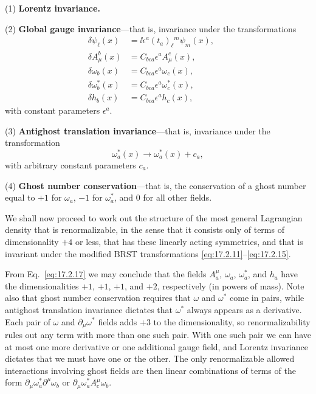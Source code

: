 \noindent(1) \textbf{Lorentz invariance.}

\noindent(2) \textbf{Global gauge invariance}---that is, invariance under the transformations
\begin{align}
\delta\psi_\ell(x)&=\ii\epsilon^a(t_a)_\ell{}^m\psi_m(x),
&&\tag{17.2.18}\label{eq:17.2.18}\\
\delta A^b_\mu(x)&=C_{bca}\epsilon^a A^c_\mu(x),
&&\tag{17.2.19}\label{eq:17.2.19}\\
\delta\omega_b(x)&=C_{bca}\epsilon^a\omega_c(x),
&&\tag{17.2.20}\label{eq:17.2.20}\\
\delta\omega_b^*(x)&=C_{bca}\epsilon^a\omega_c^*(x),
&&\tag{17.2.21}\label{eq:17.2.21}\\
\delta h_b(x)&=C_{bca}\epsilon^a h_c(x),
&&\tag{17.2.22}\label{eq:17.2.22}
\end{align}
with constant parameters $\epsilon^a$.

\noindent(3) \textbf{Antighost translation invariance}---that is, invariance under the transformation
\begin{equation}
\omega_a^*(x)\longrightarrow\omega_a^*(x)+c_a,
\tag{17.2.23}\label{eq:17.2.23}
\end{equation}
with arbitrary constant parameters $c_a$.

\noindent(4) \textbf{Ghost number conservation}---that is, the conservation of a ghost number equal to $+1$ for $\omega_a$, $-1$ for $\omega_a^*$, and 0 for all other fields.

We shall now proceed to work out the structure of the most general Lagrangian density that is renormalizable, in the sense that it consists only of terms of dimensionality $+4$ or less, that has these linearly acting symmetries, and that is invariant under the modified BRST transformations \eqref{eq:17.2.11}--\eqref{eq:17.2.15}.

From Eq.~\eqref{eq:17.2.17} we may conclude that the fields $A_a^\mu$, $\omega_a$, $\omega_a^*$, and $h_a$ have the dimensionalities $+1$, $+1$, $+1$, and $+2$, respectively (in powers of mass). Note also that ghost number conservation requires that $\omega$ and $\omega^*$ come in pairs, while antighost translation invariance dictates that $\omega^*$ always appears as a derivative. Each pair of $\omega$ and $\partial_\mu\omega^*$ fields adds $+3$ to the dimensionality, so renormalizability rules out any term with more than one such pair. With one such pair we can have at most one more derivative or one additional gauge field, and Lorentz invariance dictates that we must have one or the other. The only renormalizable allowed interactions involving ghost fields are then linear combinations of terms of the form $\partial_\mu\omega_a^*\partial^\mu\omega_b$ or $\partial_\mu\omega_a^*A_c^\mu\omega_b$.

